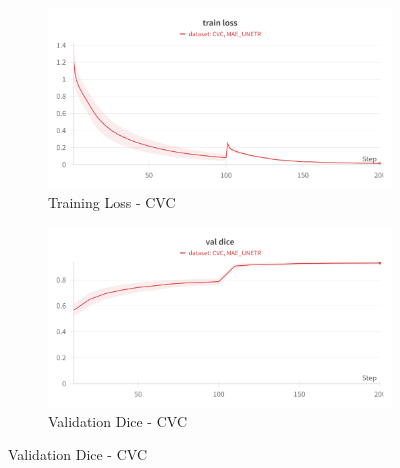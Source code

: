 \begin{figure}[htbp]
    \centering
    \begin{subfigure}{0.45\textwidth}
        \centering
        \includegraphics[width=\linewidth]{images/mae_unetr/cvc_train_loss.png}
        \caption{Training Loss - CVC}
    \end{subfigure}
    \hfill
    \begin{subfigure}{0.45\textwidth}
        \centering
        \includegraphics[width=\linewidth]{images/mae_unetr/cvc_val_dice.png}
        \caption{Validation Dice - CVC}
    \end{subfigure}
    

\end{figure}
